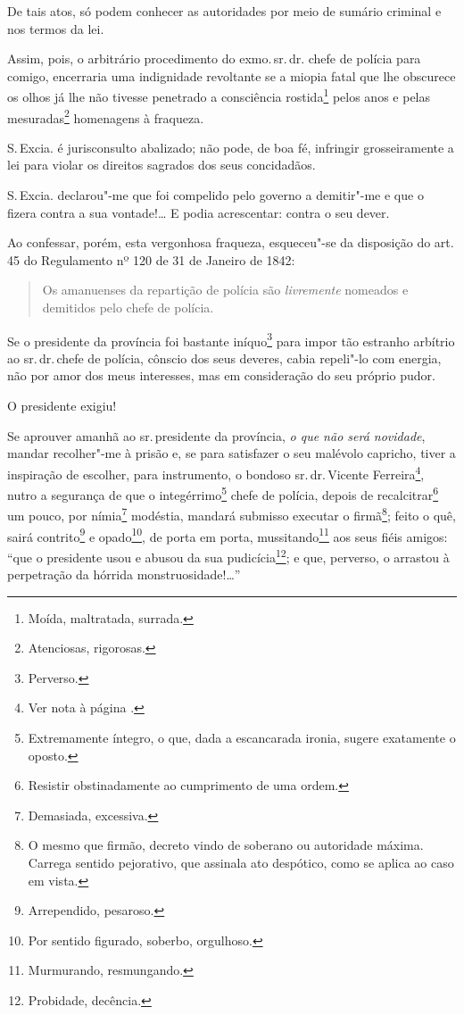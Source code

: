De tais atos, só podem conhecer as autoridades por meio de sumário
criminal e nos termos da lei.

Assim, pois, o arbitrário procedimento do exmo.\,sr.\,dr. chefe de polícia
para comigo, encerraria uma indignidade revoltante se a miopia fatal que
lhe obscurece os olhos já lhe não tivesse penetrado a consciência
rostida\footnote{Moída, maltratada, surrada.} pelos anos e pelas
mesuradas\footnote{Atenciosas, rigorosas.} homenagens à fraqueza.

S.\,Excia. é jurisconsulto abalizado; não pode, de boa fé, infringir
grosseiramente a lei para violar os direitos sagrados dos seus
concidadãos.

S.\,Excia. declarou"-me que foi compelido pelo governo a demitir"-me e que
o fizera contra a sua vontade!\ldots{} E podia acrescentar: contra o seu
dever.

Ao confessar, porém, esta vergonhosa fraqueza, esqueceu"-se da disposição
do art. 45 do Regulamento nº 120 de 31 de Janeiro de 1842:

\begin{quote}
Os amanuenses da repartição de polícia são \emph{livremente} nomeados e
demitidos pelo chefe de polícia.
\end{quote}

Se o presidente da província foi bastante iníquo\footnote{Perverso.}
para impor tão estranho arbítrio ao sr.\,dr.\,chefe de polícia, cônscio
dos seus deveres, cabia repeli"-lo com energia, não por amor dos meus
interesses, mas em consideração do seu próprio pudor.

O presidente exigiu!

Se aprouver amanhã ao sr.\,presidente da província, \emph{o que não será
novidade}, mandar recolher"-me à prisão e, se para satisfazer o seu
malévolo capricho, tiver a inspiração de escolher, para instrumento, o
bondoso sr.\,dr.\,Vicente Ferreira\footnote{Ver nota à página \pageref{bueno}.}, nutro a segurança de que o
integérrimo\footnote{Extremamente íntegro, o que, dada a escancarada
  ironia, sugere exatamente o oposto.} chefe de polícia, depois de
recalcitrar\footnote{Resistir obstinadamente ao cumprimento de uma
  ordem.} um pouco, por nímia\footnote{Demasiada, excessiva.}
modéstia, mandará submisso executar o firmã\footnote{O mesmo que
  firmão, decreto vindo de soberano ou autoridade máxima. Carrega
  sentido pejorativo, que assinala ato despótico, como se aplica ao caso
  em vista.}; feito o quê, sairá contrito\footnote{Arrependido,
  pesaroso.} e opado\footnote{Por sentido figurado, soberbo,
  orgulhoso.}, de porta em porta, mussitando\footnote{Murmurando,
  resmungando.} aos seus fiéis amigos: ``que o presidente usou e abusou
da sua pudicícia\footnote{Probidade, decência.}; e que, perverso, o
arrastou à perpetração da hórrida monstruosidade!\ldots{}''

